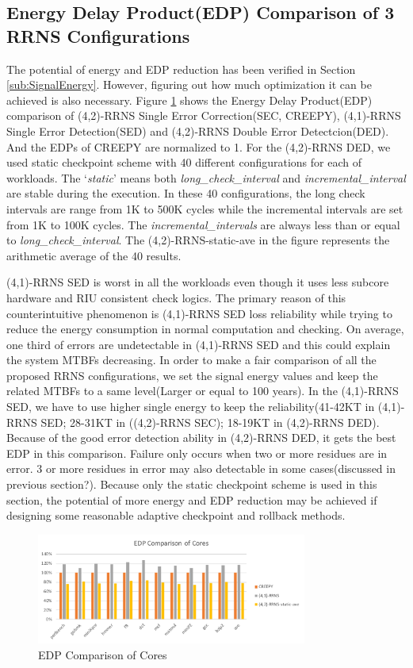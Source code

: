 \documentclass{sig-alternate}
\begin{document}
\subsection{Energy Delay Product(EDP) Comparison of 3 RRNS Configurations}
\label{sec:3Config}
The potential of energy and EDP reduction has been verified in Section \ref{sub:SignalEnergy}. However, figuring out how much optimization it can be achieved is also necessary. Figure \ref{fig_41RRNS} shows the Energy Delay Product(EDP) comparison of (4,2)-RRNS Single Error Correction(SEC, CREEPY), (4,1)-RRNS Single Error Detection(SED) and (4,2)-RRNS Double Error Detectcion(DED). And the EDPs of CREEPY are normalized to 1. For the (4,2)-RRNS DED, we used static checkpoint scheme with 40 different configurations for each of workloads. The `\textit{static}' means both \textit{long\_check\_interval} and \textit{incremental\_interval} are stable during the execution. In these 40 configurations, the long check intervals are range from 1K to 500K cycles while the incremental intervals are set from 1K to 100K cycles. The \textit{incremental\_intervals} are always less than or equal to  \textit{long\_check\_interval}. The (4,2)-RRNS-static-ave in the figure represents the arithmetic average of the 40 results.  

(4,1)-RRNS SED is worst in all the workloads even though it uses less subcore hardware and RIU consistent check logics. The primary reason of this counterintuitive phenomenon is  (4,1)-RRNS SED loss reliability while trying to reduce the energy consumption in normal computation and checking. On average, one third of errors are undetectable in (4,1)-RRNS SED and this could explain the system MTBFs decreasing. In order to make a fair comparison of all the proposed RRNS configurations, we set the signal energy values and keep the related MTBFs to a same level(Larger or equal to 100 years). In the (4,1)-RRNS SED, we have to use higher single energy to keep the reliability(41-42KT in (4,1)-RRNS SED; 28-31KT in ((4,2)-RRNS SEC); 18-19KT in (4,2)-RRNS DED).  Because of the good error detection ability in (4,2)-RRNS DED, it gets the best EDP in this comparison. Failure only occurs when two or more residues are in error. 3 or more residues in error may also detectable in some cases(discussed in previous section?). Because only the static checkpoint scheme is used in this section, the potential of more energy and EDP reduction may be achieved if designing some reasonable adaptive checkpoint and rollback methods.  

\begin{figure}[H]
\centering
\includegraphics[width=3.5in]{graphics/41RRNS.pdf}
\caption{EDP Comparison of Cores}
\label{fig_41RRNS}
\end{figure}
\end{document}
